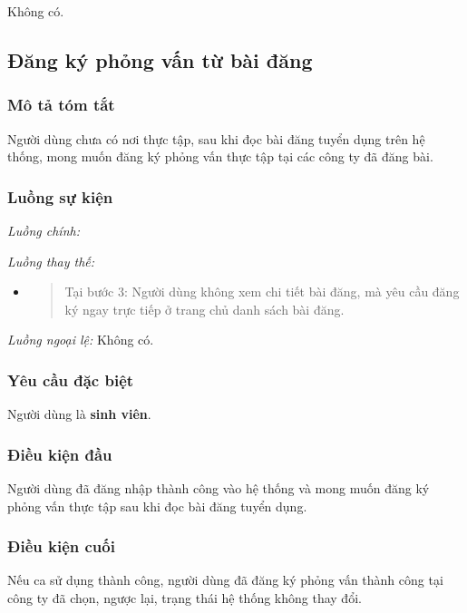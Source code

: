 \documentclass[./../main.tex]{subfiles}
\begin{document}
Không có.

\subsection{Đăng ký phỏng vấn từ bài đăng}

\subsubsection*{Mô tả tóm tắt}

Người dùng chưa có nơi thực tập, sau khi đọc bài đăng tuyển dụng trên hệ
thống, mong muốn đăng ký phỏng vấn thực tập tại các công ty đã đăng bài.

\subsubsection*{Luồng sự kiện}

\emph{Luồng chính:}

\emph{Luồng thay thế:}

\begin{itemize}
\item
  \begin{quote}
  Tại bước 3: Người dùng không xem chi tiết bài đăng, mà yêu cầu đăng ký
  ngay trực tiếp ở trang chủ danh sách bài đăng.
  \end{quote}
\end{itemize}

\emph{Luồng ngoại lệ:} Không có.

\subsubsection*{Yêu cầu đặc biệt}

Người dùng là \textbf{sinh viên}.

\subsubsection*{Điều kiện đầu}

Người dùng đã đăng nhập thành công vào hệ thống và mong muốn đăng ký
phỏng vấn thực tập sau khi đọc bài đăng tuyển dụng.

\subsubsection*{Điều kiện cuối}

Nếu ca sử dụng thành công, người dùng đã đăng ký phỏng vấn thành công
tại công ty đã chọn, ngược lại, trạng thái hệ thống không thay đổi.
\end{document}
